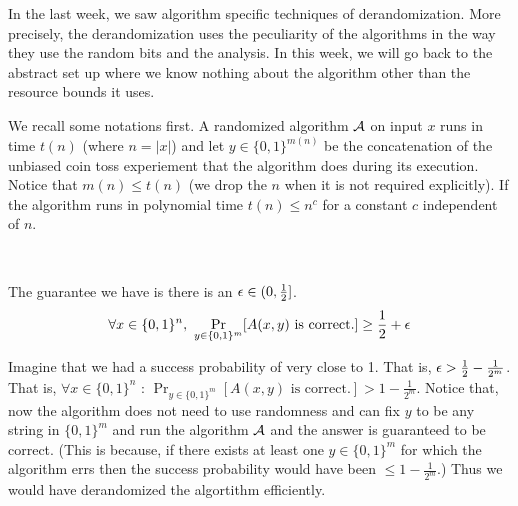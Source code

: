 \noindent 

In the last week, we saw algorithm specific techniques of derandomization. More precisely, the derandomization uses the peculiarity of the algorithms in the way they use the random bits and the analysis. In this week, we will go back to the abstract set up where we know nothing about the algorithm other than the resource bounds it uses.

We recall some notations first. A randomized algorithm ${\cal{A}}$ on input $x$ runs in time $t(n)$ (where $n=|x|$) and let $y \in \{0,1\}^{m(n)}$ be the concatenation of the unbiased coin toss experiement that the algorithm does during its execution. Notice that $m(n) \le t(n)$ (we drop the $n$ when it is not required explicitly). If the algorithm runs in polynomial time $t(n) \le n^c$ for a constant $c$ independent of $n$. \\

\begin{minipage}{0.4\linewidth}
\end{minipage}
\begin{minipage}{0.05\linewidth}
~
\end{minipage}
\begin{minipage}{0.5\linewidth}
\vspace{-7mm}
The guarantee we have is there is an $\epsilon \in (0,\frac{1}{2}]$.
\vspace{-3mm}
$$\forall x \in \{0,1\}^n,~\Pr_{y \in \{0,1\}^m} [A(x,y) \textrm{ is correct.}] \ge \frac{1}{2}+\epsilon $$
\end{minipage}
\vspace{3mm}

\noindent Imagine that we had a success probability of very close to 1. That is, $\epsilon > \frac{1}{2}-\frac{1}{2^{m}}$. That is, $\forall x \in \{0,1\}^n$ : 
$\Pr_{y \in \{0,1\}^m} [A(x,y) \textrm{ is correct.}] > 1-\frac{1}{2^m}$. Notice that, now the algorithm does not need to use randomness and can fix $y$ to be any string in $\{0,1\}^m$ and run the algorithm ${\cal{A}}$ and the answer is guaranteed to be correct. (This is because, if there exists at least one $y \in \{0,1\}^m$ for which the algorithm errs then the success probability would have been $\le 1-\frac{1}{2^m}$.) Thus we would have derandomized the algortithm efficiently.


